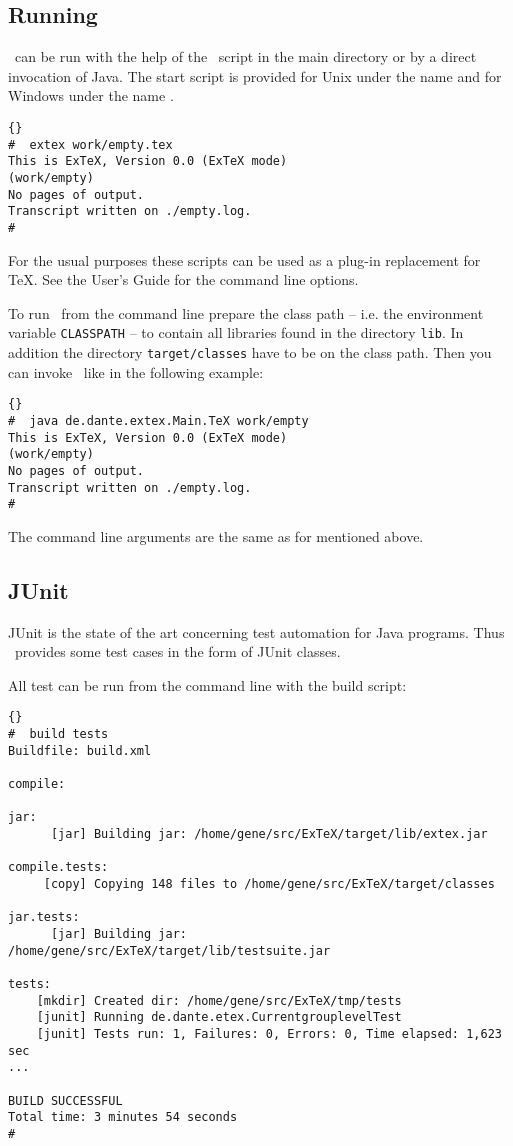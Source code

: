 \subsection{Running \ExTeX}

\ExTeX\ can be run with the help of the \ExTeX\ script in the main
directory or by a direct invocation of Java. The start script is
provided for Unix under the name  and for Windows under
the name .
\begin{lstlisting}{}
#  extex work/empty.tex
This is ExTeX, Version 0.0 (ExTeX mode)
(work/empty)
No pages of output.
Transcript written on ./empty.log.
#
\end{lstlisting}{}

For the usual purposes these scripts can be used as a plug-in
replacement for \TeX. See the User's Guide for the command line
options.

To run \ExTeX\ from the command line prepare the class path -- i.e.
the environment variable \texttt{CLASSPATH} -- to contain all
libraries found in the directory \texttt{lib}. In addition the
directory \texttt{target/classes} have to be on the class path.
Then you can invoke \ExTeX\ like in the following example:

\begin{lstlisting}{}
#  java de.dante.extex.Main.TeX work/empty
This is ExTeX, Version 0.0 (ExTeX mode)
(work/empty)
No pages of output.
Transcript written on ./empty.log.
#
\end{lstlisting}{}

The command line arguments are the same as for  mentioned
above.


\subsection{JUnit}\label{sec:shell-junit}

JUnit is the state of the art concerning test automation for Java
programs. Thus \ExTeX\ provides some test cases in the form of JUnit
classes.

All test can be run from the command line with the build script:

\begin{lstlisting}{}
#  build tests
Buildfile: build.xml

compile:

jar:
      [jar] Building jar: /home/gene/src/ExTeX/target/lib/extex.jar

compile.tests:
     [copy] Copying 148 files to /home/gene/src/ExTeX/target/classes

jar.tests:
      [jar] Building jar: /home/gene/src/ExTeX/target/lib/testsuite.jar

tests:
    [mkdir] Created dir: /home/gene/src/ExTeX/tmp/tests
    [junit] Running de.dante.etex.CurrentgrouplevelTest
    [junit] Tests run: 1, Failures: 0, Errors: 0, Time elapsed: 1,623 sec
...

BUILD SUCCESSFUL
Total time: 3 minutes 54 seconds
#
\end{lstlisting}

